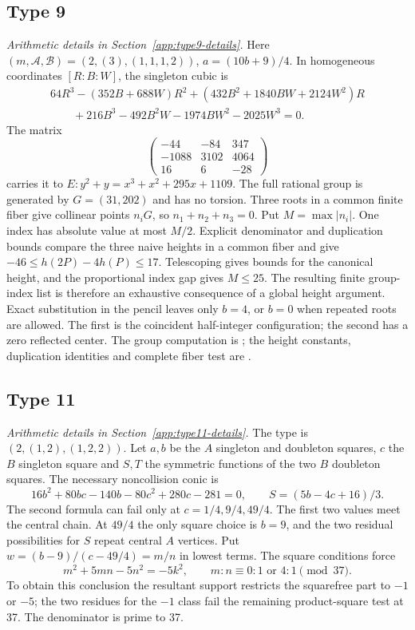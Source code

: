 \subsection{Type 9}\label{app:type9}
\noindent\emph{Arithmetic details in Section~\ref{app:type9-details}.}\enspace
Here $(m,\mathcal A,\mathcal B)=(2,(3),(1,1,1,2))$,
$a=(10b+9)/4$. In homogeneous coordinates $[R:B:W]$, the singleton
cubic is
\[
\begin{split}
 64R^3-(352B+688W)R^2+(432B^2+1840BW+2124W^2)R\\
 \qquad+216B^3-492B^2W-1974BW^2-2025W^3=0.
\end{split}
\]
The matrix
\[
 \begin{pmatrix}-44&-84&347\\-1088&3102&4064\\16&6&-28\end{pmatrix}
\]
carries it to $E:y^2+y=x^3+x^2+295x+1109$. The full rational
group is generated by $G=(31,202)$ and has no torsion.
Three roots in a common finite fiber give collinear points $n_iG$,
so $n_1+n_2+n_3=0$. Put $M=\max|n_i|$. One index has absolute
value at most $M/2$. Explicit denominator and duplication bounds
compare the three naive heights in a common fiber and give
$-46\leq h(2P)-4h(P)\leq17$. Telescoping gives bounds for the
canonical height, and the proportional index gap gives $M\leq25$.
The resulting finite group-index list is therefore an exhaustive
consequence of a global height argument. Exact substitution in the
pencil leaves only $b=4$, or $b=0$ when repeated roots are allowed.
The first is the coincident half-integer configuration; the second
has a zero reflected center. The group computation is
; the height constants, duplication identities
and complete fiber test are .

\subsection{Type 11}\label{app:type11}
\noindent\emph{Arithmetic details in Section~\ref{app:type11-details}.}\enspace
The type is $(2,(1,2),(1,2,2))$. Let $a,b$ be the $A$ singleton
and doubleton squares, $c$ the $B$ singleton square and $S,T$ the
symmetric functions of the two $B$ doubleton squares. The necessary
noncollision conic is
\[
 16b^2+80bc-140b-80c^2+280c-281=0,
 \qquad S=(5b-4c+16)/3.
\]
The second formula can fail only at $c=1/4,9/4,49/4$.
The first two values meet the central chain. At $49/4$ the only square
choice is $b=9$, and the two residual possibilities for $S$ repeat
central $A$ vertices. Put $w=(b-9)/(c-49/4)=m/n$ in lowest terms.
The square conditions force
\[
 m^2+5mn-5n^2=-5k^2,\qquad m:n\equiv0:1\text{ or }4:1\pmod{37}.
\]
To obtain this conclusion the resultant support restricts the squarefree
part to $-1$ or $-5$; the two residues for the $-1$ class fail the
remaining product-square test at 37. The denominator is prime to 37.

